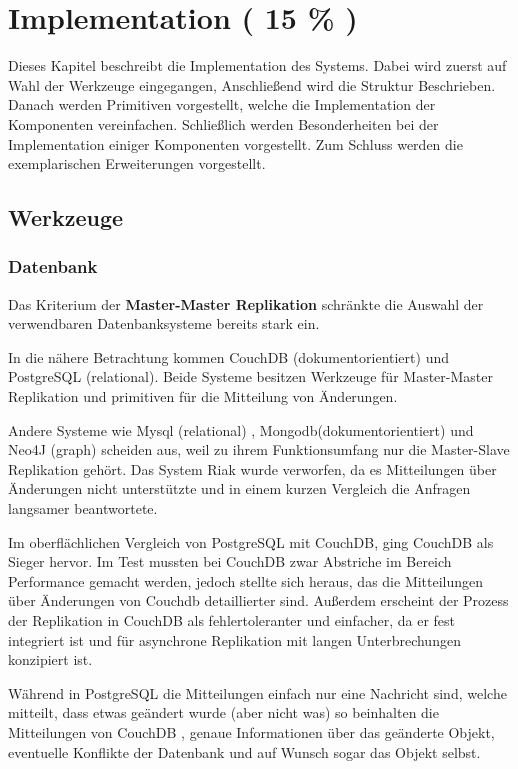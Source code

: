 \chapter{Implementation ( 15 \% ) }

Dieses Kapitel beschreibt die Implementation des Systems.
Dabei wird zuerst auf Wahl der Werkzeuge eingegangen,
Anschließend wird die Struktur Beschrieben.
Danach werden Primitiven vorgestellt, welche die Implementation der Komponenten vereinfachen.
Schließlich werden Besonderheiten bei der Implementation einiger Komponenten vorgestellt.
Zum Schluss werden die exemplarischen Erweiterungen vorgestellt.

\section{Werkzeuge}
\subsection{Datenbank}

Das Kriterium der \textbf{Master-Master Replikation}
schränkte die Auswahl der verwendbaren Datenbanksysteme bereits stark ein.

In die nähere Betrachtung kommen CouchDB \cite{couchdb:website} (dokumentorientiert)
und PostgreSQL \cite{postgresql:website} (relational).
Beide Systeme besitzen Werkzeuge für Master-Master Replikation
und primitiven für die Mitteilung von Änderungen.

Andere Systeme wie Mysql (relational) \cite{mysql:website}, Mongodb(dokumentorientiert) \cite{mongodb:website}
und  Neo4J (graph) \cite{neo4j:website} scheiden aus, weil zu ihrem Funktionsumfang
nur die Master-Slave Replikation geh\"ort.
Das System Riak \cite{riak:website} wurde verworfen, da es Mitteilungen über Änderungen nicht unterstützte und in einem kurzen Vergleich
die Anfragen langsamer beantwortete.

Im oberflächlichen Vergleich von PostgreSQL mit CouchDB, ging CouchDB als Sieger hervor.
Im Test mussten bei CouchDB zwar Abstriche im Bereich Performance gemacht werden,
jedoch stellte sich heraus, das die Mitteilungen über Änderungen von Couchdb detaillierter sind.
Außerdem erscheint der Prozess der Replikation in CouchDB als fehlertoleranter und einfacher, da er fest integriert ist und für asynchrone Replikation mit langen Unterbrechungen konzipiert ist.

Während in PostgreSQL die Mitteilungen einfach nur eine Nachricht sind,
welche mitteilt, dass etwas geändert wurde (aber nicht was)
so beinhalten die Mitteilungen von CouchDB \cite[Chap Notifications]{couchdb:guide}, genaue Informationen
über das geänderte Objekt, eventuelle Konflikte der Datenbank
und auf Wunsch sogar das Objekt selbst.

